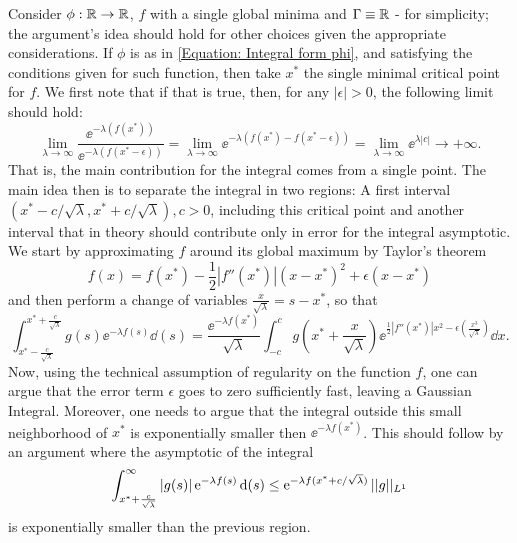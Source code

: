 Consider $\phi: \R \rightarrow \R$, $f$ with a single global minima and $\Gamma \equiv \R$ - for simplicity; the argument's idea should hold for other choices given the appropriate considerations. If $\phi$ is as in \eqref{Equation: Integral form phi}, and satisfying the conditions given for such function, then take $x^*$ the single minimal critical point for $f$. We first note that if that is true, then, for any $|\epsilon| > 0$, the following limit should hold:
\begin{equation}
	\lim_{\lambda \rightarrow \infty} \frac{\ee^{-\lambda(f(x^*))}}{\ee^{-\lambda(f(x^* - \epsilon))}} = \lim_{\lambda \rightarrow \infty} \ee^{-\lambda(f(x^*) - f(x^* - \epsilon))} = \lim_{\lambda \rightarrow \infty} \ee^{\lambda |c|} \rightarrow + \infty. 
\end{equation}
That is, the main contribution for the integral comes from a single point. The main idea then is to separate the integral in two regions: A first interval $(x^* - c/\sqrt{\lambda}, x^* + c/\sqrt{\lambda}), c > 0$, including this critical point and another interval that in theory should contribute only in error for the integral asymptotic. We start by approximating $f$ around its global maximum by Taylor's theorem 
	\begin{equation}
		f(x) = f(x^*) - \frac{1}{2} |f''(x^*)|(x-x^*)^2 + \epsilon(x-x^*)
	\end{equation}
	and then perform a change of variables $\frac{x}{\sqrt{\lambda}} = s - x^*$, so that 
	\begin{equation}
		\int_{x^*-\frac{c}{\sqrt{\lambda}}}^{x^*+\frac{c}{\sqrt{\lambda}}} g(s) \ee^{-\lambda f(s)} \dd(s) = \frac{\ee^{-\lambda f(x^*)}}{\sqrt{\lambda}} \int_{-c}^c g\left(x^* + \frac{x}{\sqrt{\lambda}}\right) \ee^{\frac{1}{2} |f''(x^*)|x^2 - \epsilon \left(\frac{x^3}{\sqrt{\lambda}}\right)} \dd x.
	\end{equation}
	Now, using the technical assumption of regularity on the function $f$, one can argue that the error term $\epsilon$ goes to zero sufficiently fast, leaving a Gaussian Integral. Moreover, one needs to argue that the integral outside this small neighborhood of $x^*$ is exponentially smaller then $\ee^{-\lambda f(x^*)}$. This should follow by an argument where the asymptotic of the integral 
	\begin{equation}
			\int_{x^*+ \frac{c}{\sqrt{\lambda}}}^{\infty} |g(s)| \ee^{-\lambda f(s)} \dd(s) \leq \ee^{-\lambda f(x^*+ c/\sqrt{\lambda})} \normL{1}{g}{}
	\end{equation}
	is exponentially smaller than the previous region. 
